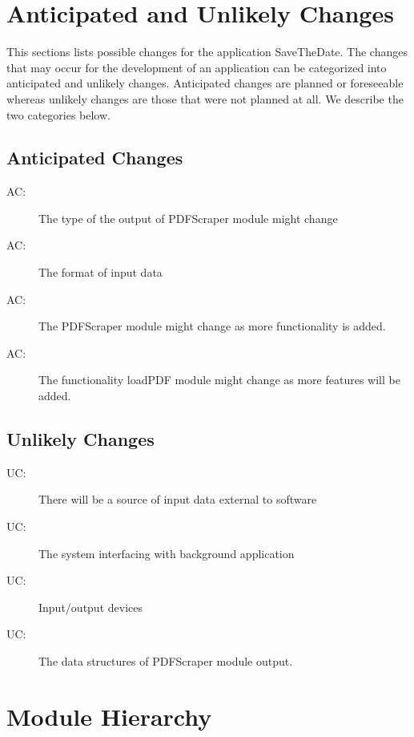 \documentclass[12pt, titlepage]{article}
\newcounter{acnum}
\newcommand{\actheacnum}{AC\theacnum}
\newcounter{ucnum}
\newcommand{\uctheucnum}{UC\theucnum}
\begin{document}
\section{Anticipated and Unlikely Changes} 
This sections lists possible changes for the application SaveTheDate. The changes that may occur for the development of an application can be categorized into anticipated and unlikely changes. Anticipated changes are planned or foreseeable whereas unlikely changes are those that were not planned at all. We describe the two categories below.

\subsection{Anticipated Changes} 
\begin{description}

\item[ \actheacnum \label{ac1}:]The type of the output of PDFScraper module might change
\item[ \actheacnum \label{ac2}:] The format of input data
\item[ \actheacnum \label{ac3}:] The PDFScraper module might change as more functionality is added.

\item[ \actheacnum \label{ac4}:]The functionality loadPDF module might change as more features will be added. 

\end{description}

\subsection{Unlikely Changes}
\begin{description}
\item[ \uctheucnum \label{uc1}:] There will be a source of input data external to software
\item[ \uctheucnum \label{uc2}:] The system interfacing with background application 
\item[ \uctheucnum \label{uc3}:] Input/output devices
\item[ \uctheucnum \label{uc4}:] The data structures of PDFScraper module output. 
\end{description}

\section{Module Hierarchy} 
\end{document}

